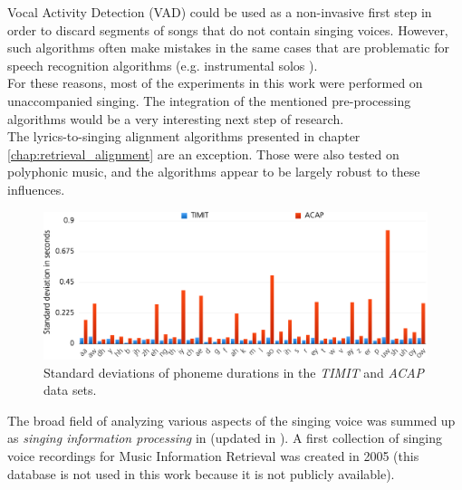\begin{description}
 Vocal Activity Detection (VAD) could be used as a non-invasive first step in order to discard segments of songs that do not contain singing voices. However, such algorithms often make mistakes in the same cases that are problematic for speech recognition algorithms (e.g. instrumental solos \cite{schlueter2016_ismir}).\\
 For these reasons, most of the experiments in this work were performed on unaccompanied singing. The integration of the mentioned pre-processing algorithms would be a very interesting next step of research.\\
The lyrics-to-singing alignment algorithms presented in chapter \ref{chap:retrieval_alignment} are an exception. Those were also tested on polyphonic music, and the algorithms appear to be largely robust to these influences.
 \end{description}

\begin{figure}
	\begin{center}
		\includegraphics[width=1\textwidth]{images/phoneme_stats.png}
		\caption{Standard deviations of phoneme durations in the \textit{TIMIT} and \textit{ACAP} data sets.}
		\label{fig:phoneme_stats}
	\end{center}
\end{figure}

The broad field of analyzing various aspects of the singing voice was summed up as \textit{singing information processing} in \cite{singing_information_processing} (updated in \cite{singing_information_processing2}). A first collection of singing voice recordings for Music Information Retrieval was created in 2005 \cite{jap_humming} (this database is not used in this work because it is not publicly available).


